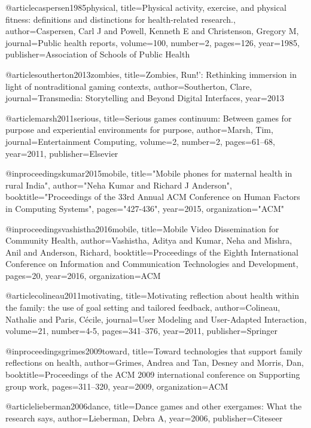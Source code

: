 @article{caspersen1985physical,
  title={Physical activity, exercise, and physical fitness: definitions and distinctions for health-related research.},
  author={Caspersen, Carl J and Powell, Kenneth E and Christenson, Gregory M},
  journal={Public health reports},
  volume={100},
  number={2},
  pages={126},
  year={1985},
  publisher={Association of Schools of Public Health}
}

@article{southerton2013zombies,
  title={Zombies, Run!’: Rethinking immersion in light of nontraditional gaming contexts},
  author={Southerton, Clare},
  journal={Transmedia: Storytelling and Beyond Digital Interfaces},
  year={2013}
}


@article{marsh2011serious,
  title={Serious games continuum: Between games for purpose and experiential environments for purpose},
  author={Marsh, Tim},
  journal={Entertainment Computing},
  volume={2},
  number={2},
  pages={61--68},
  year={2011},
  publisher={Elsevier}
}

@inproceedings{kumar2015mobile,
  title="Mobile phones for maternal health in rural India",
  author="Neha Kumar and Richard J Anderson",
  booktitle="Proceedings of the 33rd Annual ACM Conference on Human Factors in Computing Systems",
  pages="427-436",
  year={2015},
  organization="ACM"
}

@inproceedings{vashistha2016mobile,
  title={Mobile Video Dissemination for Community Health},
  author={Vashistha, Aditya and Kumar, Neha and Mishra, Anil and Anderson, Richard},
  booktitle={Proceedings of the Eighth International Conference on Information and Communication Technologies and Development},
  pages={20},
  year={2016},
  organization={ACM}
}

@article{colineau2011motivating,
  title={Motivating reflection about health within the family: the use of goal setting and tailored feedback},
  author={Colineau, Nathalie and Paris, C{\'e}cile},
  journal={User Modeling and User-Adapted Interaction},
  volume={21},
  number={4-5},
  pages={341--376},
  year={2011},
  publisher={Springer}
}

@inproceedings{grimes2009toward,
  title={Toward technologies that support family reflections on health},
  author={Grimes, Andrea and Tan, Desney and Morris, Dan},
  booktitle={Proceedings of the ACM 2009 international conference on Supporting group work},
  pages={311--320},
  year={2009},
  organization={ACM}
}


@article{lieberman2006dance,
  title={Dance games and other exergames: What the research says},
  author={Lieberman, Debra A},
  year={2006},
  publisher={Citeseer}
}

